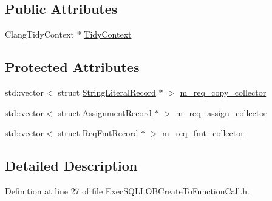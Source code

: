 \subsection*{Public Attributes}
\begin{DoxyCompactItemize}
\item 
Clang\+Tidy\+Context $\ast$ \hyperlink{classclang_1_1tidy_1_1pagesjaunes_1_1_exec_s_q_l_l_o_b_create_to_function_call_a4d73eba1216ff222ff0d657c9e92b6ed}{Tidy\+Context}
\end{DoxyCompactItemize}
\subsection*{Protected Attributes}
\begin{DoxyCompactItemize}
\item 
std\+::vector$<$ struct \hyperlink{structclang_1_1tidy_1_1pagesjaunes_1_1_exec_s_q_l_l_o_b_create_to_function_call_1_1_string_literal_record}{String\+Literal\+Record} $\ast$ $>$ \hyperlink{classclang_1_1tidy_1_1pagesjaunes_1_1_exec_s_q_l_l_o_b_create_to_function_call_a38e88bc581f39bf4430717a72bf80f0e}{m\+\_\+req\+\_\+copy\+\_\+collector}
\item 
std\+::vector$<$ struct \hyperlink{structclang_1_1tidy_1_1pagesjaunes_1_1_exec_s_q_l_l_o_b_create_to_function_call_1_1_assignment_record}{Assignment\+Record} $\ast$ $>$ \hyperlink{classclang_1_1tidy_1_1pagesjaunes_1_1_exec_s_q_l_l_o_b_create_to_function_call_ad8b6f7ea92efb40bbad025ae2981b8a4}{m\+\_\+req\+\_\+assign\+\_\+collector}
\item 
std\+::vector$<$ struct \hyperlink{structclang_1_1tidy_1_1pagesjaunes_1_1_exec_s_q_l_l_o_b_create_to_function_call_1_1_req_fmt_record}{Req\+Fmt\+Record} $\ast$ $>$ \hyperlink{classclang_1_1tidy_1_1pagesjaunes_1_1_exec_s_q_l_l_o_b_create_to_function_call_a91312e562fe8dcd6ebffadfb809d4f6a}{m\+\_\+req\+\_\+fmt\+\_\+collector}
\end{DoxyCompactItemize}


\subsection{Detailed Description}


Definition at line 27 of file Exec\+S\+Q\+L\+L\+O\+B\+Create\+To\+Function\+Call.\+h.




